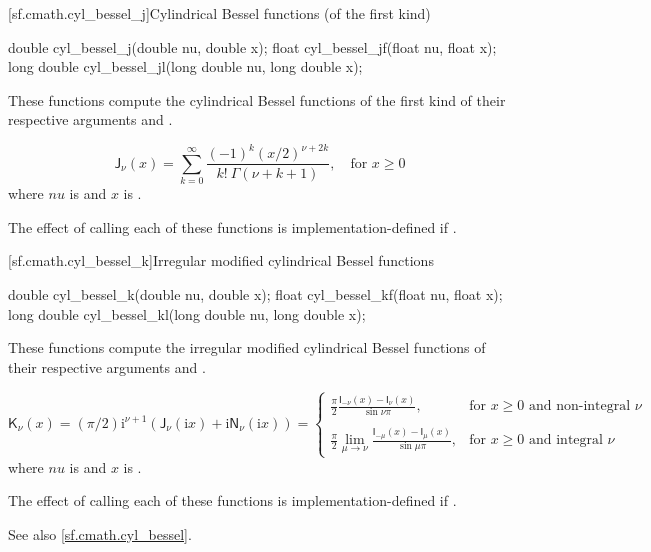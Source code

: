 [sf.cmath.cyl_bessel_j]{Cylindrical Bessel functions (of the first kind)}%
%
%
%
%
%
\begin{itemdecl}
double       cyl_bessel_j(double nu, double x);
float        cyl_bessel_jf(float nu, float x);
long double  cyl_bessel_jl(long double nu, long double x);
\end{itemdecl}

\begin{itemdescr}

\pnum\effects
These functions compute
the cylindrical Bessel functions of the first kind
of their respective arguments
 and .

\pnum\returns
\[%
  \mathsf{J}_\nu(x) =
  \sum_{k=0}^\infty \frac{(-1)^k (x/2)^{\nu+2k}}
			 {k! \: \Gamma(\nu+k+1)},
	   \quad \mbox{for $x \ge 0$}
\]
where
$nu$ is  and
$x$ is .

\pnum\remark
The effect of calling each of these functions
is implementation-defined
if .
\end{itemdescr}

[sf.cmath.cyl_bessel_k]{Irregular modified cylindrical Bessel functions}%
%
%
%
%
%
\begin{itemdecl}
double       cyl_bessel_k(double nu, double x);
float        cyl_bessel_kf(float nu, float x);
long double  cyl_bessel_kl(long double nu, long double x);
\end{itemdecl}

\begin{itemdescr}

\pnum\effects
These functions compute
the irregular modified cylindrical Bessel functions
of their respective arguments
 and .

\pnum\returns
\[%
  \mathsf{K}_\nu(x) =
  (\pi/2)\mathrm{i}^{\nu+1} (            \mathsf{J}_\nu(\mathrm{i}x)
			    + \mathrm{i} \mathsf{N}_\nu(\mathrm{i}x)
			    )
  =
  \left\{
  \begin{array}{cl}
  \displaystyle
  \frac{\pi}{2}
  \frac{\mathsf{I}_{-\nu}(x) - \mathsf{I}_{\nu}(x)}
       {\sin \nu\pi },
  & \mbox{for $x \ge 0$ and non-integral $\nu$}
  \\
  \\
  \displaystyle
  \frac{\pi}{2}
  \lim_{\mu \rightarrow \nu} \frac{\mathsf{I}_{-\mu}(x) - \mathsf{I}_{\mu}(x)}
                                  {\sin \mu\pi },
  & \mbox{for $x \ge 0$ and integral $\nu$}
  \end{array}
  \right.
\]
where
$nu$ is  and
$x$ is .

\pnum\remark
The effect of calling each of these functions
is implementation-defined
if .

\pnum See also \ref{sf.cmath.cyl_bessel}.
\end{itemdescr}

